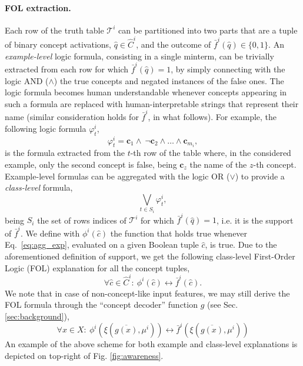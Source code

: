 \paragraph{FOL extraction.}
Each row of the truth table $\mathcal{T}^i$ can be partitioned into two parts that are a tuple of binary concept activations, $\hat{q}\in \hat{C}^i$, and the outcome of $\bar{f}^i(\hat{q}) \in \{0, 1\}$. 
An \textit{example-level} logic formula, consisting in a single minterm, can be trivially extracted from each row for which $\bar{f}^i(\hat{q})=1$, by simply connecting with the logic AND ($\wedge$) the true concepts and negated instances of the false ones. 
The logic formula becomes human understandable whenever concepts appearing in such a formula are replaced with human-interpretable strings that represent their name (similar consideration holds for $\bar{f}^i$, in what follows). For example, the following logic formula $\varphi^i_t$,
\begin{equation}
    \varphi^i_{t} = \textbf{c}_1\wedge\ \neg \textbf{c}_2 \wedge \ldots\wedge\textbf{c}_{m_i},
    \label{eq:locexp}
\end{equation}
is the formula extracted from the $t$-th row of the table where, in the considered example, only the second concept is false, being $\textbf{c}_z$ the name of the $z$-th concept.
Example-level formulas can be aggregated with the logic OR ($\vee$) to provide a \textit{class-level} formula, 
\begin{equation}
    \displaystyle\bigvee_{t \in S_i}\varphi^i_t, %
\label{eq:agg_exp}
\end{equation}
being $S_i$ the set of rows
 indices of $\mathcal{T}^i$ for which $\bar{f}^i(\hat{q}) = 1$, i.e. it is the support of $\bar{f}^i$.
We define with $\phi^i(\hat{c})$ the function that holds true whenever Eq.~\ref{eq:agg_exp}, evaluated on a given Boolean tuple $\hat{c}$, is true.
Due to the aforementioned definition of support, we get the following class-level First-Order Logic (FOL) explanation for all the concept tuples,
\begin{equation}
\forall \hat{c} \in \hat{C}^i:\ \phi^i(\hat{c})\leftrightarrow\bar{f}^i(\hat{c}).
\label{eq:FOL_C}
\end{equation}
We note that in case of non-concept-like input features, we may still derive the FOL formula through the ``concept decoder'' function $g$ (see Sec. \ref{sec:background}),
\begin{equation}
\forall x \in X:\ \phi^i\left(\xi(\overline{g(x)},\mu^i)\right)\leftrightarrow\bar{f}^i\left(\xi(\overline{g(x)},\mu^i)\right)
\end{equation}
An example of the above scheme for both example and class-level explanations is depicted on top-right of Fig. \ref{fig:awareness}.

